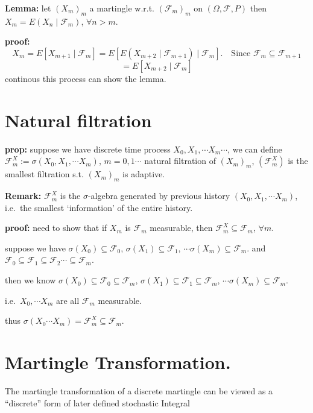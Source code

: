 \documentclass[
  letterpaper,
  DIV=11,
  numbers=noendperiod]{scrreprt}
\theoremstyle{definition}
\theoremstyle{plain}
\theoremstyle{plain}
\theoremstyle{definition}
\theoremstyle{plain}
\theoremstyle{plain}
\theoremstyle{remark}
\begin{document}
\textbf{Lemma:} let \((X_m)_m\) a martingle w.r.t. \((\mathcal{F}_m)_m\)
on \((\Omega, \mathcal{F}, P)\) then
\(X_m = E(X_n \mid \mathcal{F}_m)\), \(\forall n > m\).

\textbf{proof:} \[
X_m = E[X_{m+1} \mid \mathcal{F}_m] = E[E(X_{m+2} \mid \mathcal{F}_{m+1}) \mid \mathcal{F}_m]. \quad \text{Since } \mathcal{F}_m \subseteq \mathcal{F}_{m+1}
\] \[
= E[X_{m+2} \mid \mathcal{F}_m]
\] continous this process can show the lemma.

\section{Natural filtration}\label{natural-filtration}

\textbf{prop:} suppose we have discrete time process
\(X_0, X_1, \cdots X_m \cdots\), we can define
\(\mathcal{F}_m^X := \sigma(X_0, X_1, \cdots X_m)\), \(m = 0, 1 \cdots\)
natural filtration of \((X_m)_m\), \((\mathcal{F}_m^X)\) is the smallest
filtration s.t. \((X_m)_m\) is adaptive.

\textbf{Remark:} \(\mathcal{F}_m^X\) is the \(\sigma\)-algebra generated
by previous history \((X_0, X_1, \cdots X_m)\), i.e.~the smallest
`information' of the entire history.

\textbf{proof:} need to show that if \(X_m\) is \(\mathcal{F}_m\)
measurable, then \(\mathcal{F}_m^X \subseteq \mathcal{F}_m\),
\(\forall m\).

suppose we have \(\sigma(X_0) \subseteq \mathcal{F}_0\),
\(\sigma(X_1) \subseteq \mathcal{F}_1\),
\(\cdots \sigma(X_m) \subseteq \mathcal{F}_m\). and
\(\mathcal{F}_0 \subseteq \mathcal{F}_1 \subseteq \mathcal{F}_2 \cdots \subseteq \mathcal{F}_m\).

then we know
\(\sigma(X_0) \subseteq \mathcal{F}_0 \subseteq \mathcal{F}_m\),
\(\sigma(X_1) \subseteq \mathcal{F}_1 \subseteq \mathcal{F}_m\),
\(\cdots \sigma(X_m) \subseteq \mathcal{F}_m\).

i.e.~\(X_0, \cdots X_m\) are all \(\mathcal{F}_m\) measurable.

thus
\(\sigma(X_0 \cdots X_m) = \mathcal{F}_m^X \subseteq \mathcal{F}_m\).

\section{Martingle Transformation.}\label{martingle-transformation.}

The martingle transformation of a discrete martingle can be viewed as a
``discrete'' form of later defined stochastic Integral
\end{document}
